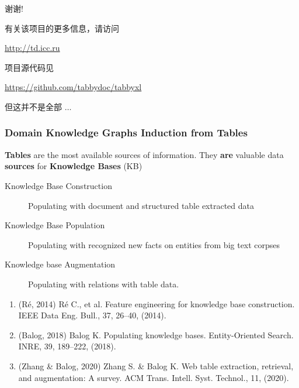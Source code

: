 \documentclass[10pt]{beamer}
\begin{document}
\begin{frame}
\Huge{\centerline{谢谢!}}
\bigskip
\footnotesize{\centerline{有关该项目的更多信息，请访问}}
\scriptsize{\centerline{\url{http://td.icc.ru}}}

\bigskip
\footnotesize{\centerline{项目源代码见}}
\scriptsize{\centerline{\url{https://github.com/tabbydoc/tabbyxl}}}
\bigskip
\begin{center}
  \Large 但这并不是全部 $\ldots$
\end{center}
\end{frame}


\begin{frame}
  \frametitle{Domain Knowledge Graphs Induction from Tables}
  \textbf{Tables} are the most available sources of information. They \textbf{are} valuable data \textbf{sources} for \textbf{Knowledge Bases} (KB)
  \begin{description}
  \item[Knowledge Base Construction] Populating with document and structured table extracted data
  \item[Knowledge Base Population] Populating with recognized new facts on entities from big text corpses
  \item[Knowledge base Augmentation] Populating with relations with table data.
  \end{description}

{\footnotesize
\begin{enumerate}
\item (Ré, 2014) Ré C., et al. Feature engineering for knowledge base construction. IEEE Data Eng. Bull., 37, 26–40, (2014).
\item    (Balog, 2018) Balog K. Populating knowledge bases. Entity-Oriented Search. INRE, 39, 189–222, (2018).
\item    (Zhang \& Balog, 2020) Zhang S. \& Balog K. Web table extraction, retrieval, and augmentation: A survey. ACM Trans. Intell. Syst. Technol., 11, (2020).
  \end{enumerate}
}
\end{frame}
\end{document}
